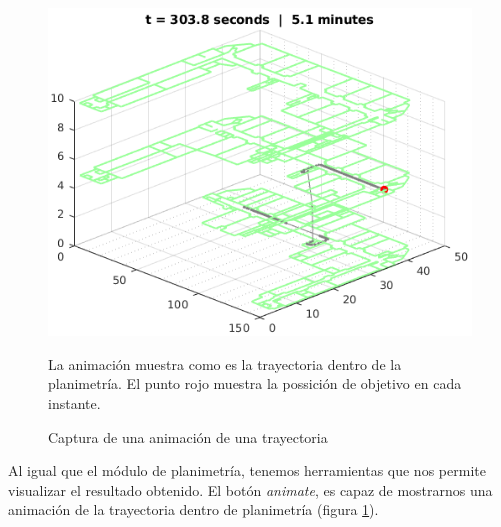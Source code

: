 \begin{figure}
    \centering
    \includegraphics[width=1.0\columnwidth]{img/Design/2animation.png}
    \caption[]{Captura de una animación de una trayectoria}
    \label{fig:animation}
    \footnotesize
    La animación muestra como es la trayectoria dentro de la planimetría. El punto rojo muestra la possición de objetivo en cada instante.
\end{figure}


Al igual que el módulo de planimetría, tenemos herramientas que nos permite visualizar el resultado obtenido. El botón \emph{animate}, es capaz de mostrarnos una animación de la trayectoria dentro de  planimetría (figura \ref{fig:animation}).






